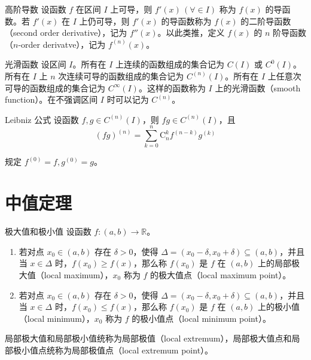 \begin{definition}{高阶导数}
  设函数 $f$ 在区间 $I$ 上可导，则 $f'(x)\,(\forall \in I)$ 称为 $f(x)$ 的导函数。若 $f'(x)$ 在 $I$ 上仍可导，则 $f'(x)$ 的导函数称为 $f(x)$ 的二阶导函数（second order derivative），记为 $f''(x)$。以此类推，定义 $f(x)$ 的 $n$ 阶导函数（$n$-order derivatve），记为 $f^{(n)}(x)$。
\end{definition}


\begin{definition}{光滑函数}
  设区间 $I$。所有在 $I$ 上连续的函数组成的集合记为 $C(I)$ 或 $C^0(I)$。所有在 $I$ 上 $n$ 次连续可导的函数组成的集合记为 $C^{(n)}(I)$。所有在 $I$ 上任意次可导的函数组成的集合记为 $C^\infty(I)$。这样的函数称为 $I$ 上的光滑函数（smooth function）。在不强调区间 $I$ 时可以记为 $C^{(n)}$。
\end{definition}

\begin{theorem}{Leibniz 公式}
  设函数 $f, g \in C^{(n)}(I)$，则 $fg \in C^{(n)}(I)$，且
  \[(fg)^{(n)} = \sum_{k = 0}^{n} \mathrm{C}_{n}^{k}f^{(n - k)}g^{(k)} \]

  规定 $f^{(0)} = f, g^{(0)} = g$。
\end{theorem}

\section{中值定理}

\begin{definition}{极大值和极小值}
  设函数 $f:(a,b)\to \mathbb{R}$。
  \begin{enumerate}
    \item 若对点 $x_0 \in (a,b)$ 存在 $\delta > 0$，使得 $\Delta = (x_0 - \delta,x_0 + \delta) \subseteq (a,b)$，并且当 $x \in \Delta$ 时，$f(x_0)\geqslant f(x)$，那么称 $f(x_0)$ 是 $f$ 在 $(a,b)$ 上的局部极大值（local maximum），$x_0$ 称为 $f$ 的极大值点（local maximum point）。
    \item 若对点 $x_0 \in (a,b)$ 存在 $\delta > 0$，使得 $\Delta = (x_0 - \delta,x_0 + \delta) \subseteq (a,b)$，并且当 $x \in \Delta$ 时，$f(x_0)\leqslant f(x)$，那么称 $f(x_0)$ 是 $f$ 在 $(a,b)$ 上的极小值（local minimum），$x_0$ 称为 $f$ 的极小值点（local minimum point）。
  \end{enumerate}
  局部极大值和局部极小值统称为局部极值（local extremum），局部极大值点和局部极小值点统称为局部极值点（local extremum point）。
\end{definition}

